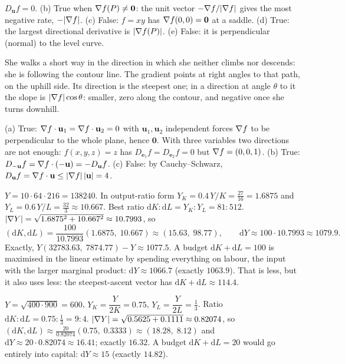 \begin{solutions}
        $D_{\mathbf{u}}f=0$. (b) True when $\nabla f(P)\neq\mathbf{0}$: the
        unit vector $-\nabla f/|\nabla f|$ gives the most negative rate,
        $-|\nabla f|$. (c) False: $f=xy$ has $\nabla f(0,0)=\mathbf{0}$ at a
        saddle. (d) True: the largest directional derivative is
        $|\nabla f(P)|$. (e) False: it is perpendicular (normal) to the level
        curve.
  \item She walks a short way in the direction in which she neither climbs
        nor descends: she is following the contour line. The gradient
        points at right angles to that path, on the uphill side. Its
        direction is the steepest one; in a direction at angle $\theta$ to
        it the slope is $|\nabla f|\cos\theta$: smaller, zero along the
        contour, and negative once she turns downhill.
  \item (a) True: $\nabla f\cdot\mathbf{u}_{1}=\nabla f\cdot\mathbf{u}_{2}=0$
        with $\mathbf{u}_{1},\mathbf{u}_{2}$ independent forces $\nabla f$ to
        be perpendicular to the whole plane, hence $\mathbf{0}$. With three
        variables two directions are not enough: $f(x,y,z)=z$ has
        $D_{\mathbf{e}_{1}}f=D_{\mathbf{e}_{2}}f=0$ but $\nabla f=(0,0,1)$.
        (b) True:
        $D_{-\mathbf{u}}f=\nabla f\cdot(-\mathbf{u})=-D_{\mathbf{u}}f$.
        (c) False: by Cauchy--Schwarz,
        $D_{\mathbf{u}}f=\nabla f\cdot\mathbf{u}\le|\nabla f|\,|\mathbf{u}|=4$.
  \item $Y=10\cdot64\cdot216=138240$. In output-ratio form
        $Y_{K}=0.4\,Y/K=\tfrac{27}{16}=1.6875$ and
        $Y_{L}=0.6\,Y/L=\tfrac{32}{3}\approx10.667$. Best ratio
        $\mathrm{d}K:\mathrm{d}L=Y_{K}:Y_{L}=81:512$.
        $|\nabla Y|=\sqrt{1.6875^{2}+10.667^{2}}\approx10.7993$, so
        \[
          (\mathrm{d}K,\mathrm{d}L)=\frac{100}{10.7993}(1.6875,\;10.667)
          \approx(15.63,\;98.77),
          \qquad \mathrm{d}Y\approx100\cdot10.7993\approx1079.9 .
        \]
        Exactly, $Y(32783.63,\;7874.77)-Y\approx1077.5$. A budget
        $\mathrm{d}K+\mathrm{d}L=100$ is maximised in the linear estimate by
        spending everything on labour, the input with the larger marginal
        product: $\mathrm{d}Y\approx1066.7$ (exactly $1063.9$). That is
        less, but it also uses less: the steepest-ascent vector has
        $\mathrm{d}K+\mathrm{d}L\approx114.4$.
  \item $Y=\sqrt{400\cdot900}=600$, $Y_{K}=\dfrac{Y}{2K}=0.75$,
        $Y_{L}=\dfrac{Y}{2L}=\tfrac13$. Ratio $\mathrm{d}K:\mathrm{d}L=
        0.75:\tfrac13=9:4$. $|\nabla Y|=\sqrt{0.5625+0.1111}\approx0.82074$,
        so $(\mathrm{d}K,\mathrm{d}L)\approx\tfrac{20}{0.82074}(0.75,\;0.3333)
        \approx(18.28,\;8.12)$ and $\mathrm{d}Y\approx20\cdot0.82074\approx
        16.41$; exactly $16.32$. A budget $\mathrm{d}K+\mathrm{d}L=20$ would
        go entirely into capital: $\mathrm{d}Y\approx15$ (exactly $14.82$).
\end{solutions}
